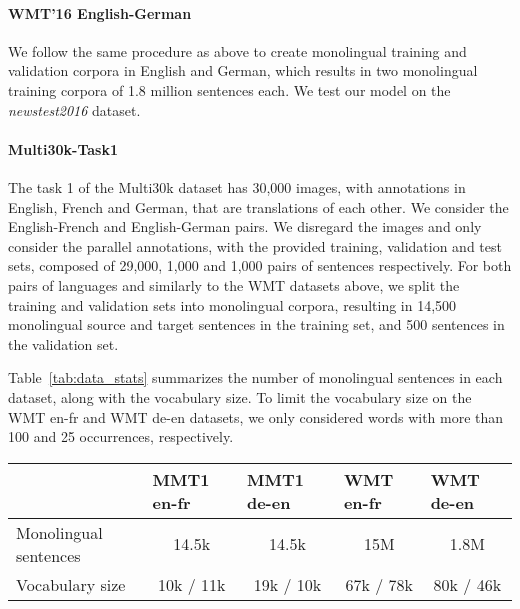 \documentclass{article} \usepackage{iclr2018_conference,times}
\begin{document}
\paragraph{WMT'16 English-German} We follow the same procedure as above to create monolingual training and validation corpora in English and German, which results in two monolingual training corpora of 1.8 million sentences each. We test our model on the \textit{newstest2016} dataset.

\paragraph{Multi30k-Task1} The task 1 of the Multi30k dataset \citep{elliott2016multi30k} has 30,000 images, with annotations in English, French and German, that are translations of each other. We consider the English-French and English-German pairs. We disregard the images and only consider the parallel annotations, with the provided training, validation and test sets, composed of 29,000, 1,000 and 1,000 pairs of sentences respectively. For both pairs of languages and similarly to the WMT datasets above, we split the training and validation sets into monolingual corpora, resulting in 14,500 monolingual source and target sentences in the training set, and 500 sentences in the validation set.

Table~\ref{tab:data_stats} summarizes the number of monolingual sentences in each dataset, along with the vocabulary size. To limit the vocabulary size on the WMT en-fr and WMT de-en datasets, we only considered words with more than 100 and 25 occurrences, respectively.


\begin{table*}[t]
    \begin{center}
    \centering
    \begin{tabular}{lllll}
    \toprule
    & MMT1 en-fr & MMT1 de-en & WMT en-fr & WMT de-en \\
    \midrule
    Monolingual sentences & \multicolumn{1}{c}{14.5k} & \multicolumn{1}{c}{14.5k} & \multicolumn{1}{c}{15M} & \multicolumn{1}{c}{1.8M} \\
    Vocabulary size & \multicolumn{1}{c}{10k / 11k} & \multicolumn{1}{c}{19k / 10k} &  \multicolumn{1}{c}{67k / 78k} &  \multicolumn{1}{c}{80k / 46k} \\
    \bottomrule
    \end{tabular}
	\caption{\textbf{Multi30k-Task1 and WMT datasets statistics.}
	To limit the vocabulary size in the WMT en-fr and WMT de-en datasets, we only considered words with more than 100 and 25 occurrences, respectively.}
	\label{tab:data_stats}
    \end{center}
\end{table*}
\end{document}
